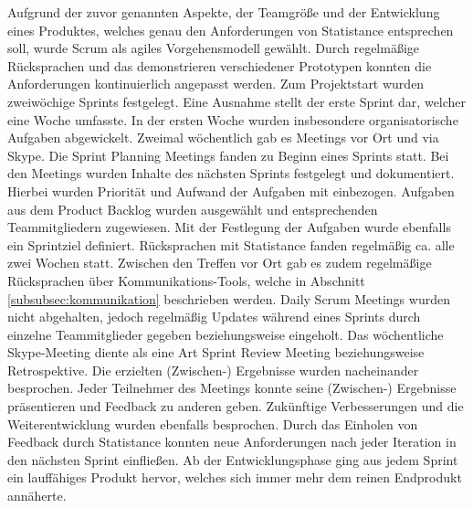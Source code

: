 Aufgrund der zuvor genannten Aspekte, der Teamgröße und der Entwicklung eines Produktes, welches genau den Anforderungen von Statistance entsprechen soll, wurde Scrum als agiles Vorgehensmodell gewählt. Durch regelmäßige Rücksprachen und das demonstrieren verschiedener Prototypen konnten die Anforderungen kontinuierlich angepasst werden. Zum Projektstart wurden zweiwöchige Sprints festgelegt. Eine Ausnahme stellt der erste Sprint dar, welcher eine Woche umfasste. In der ersten Woche wurden insbesondere organisatorische Aufgaben abgewickelt. Zweimal wöchentlich gab es Meetings vor Ort und via Skype. Die Sprint Planning Meetings fanden zu Beginn eines Sprints statt. Bei den Meetings wurden Inhalte des nächsten Sprints festgelegt und dokumentiert. Hierbei wurden Priorität und Aufwand der Aufgaben mit einbezogen. Aufgaben aus dem Product Backlog wurden ausgewählt und entsprechenden Teammitgliedern zugewiesen. Mit der Festlegung der Aufgaben wurde ebenfalls ein Sprintziel definiert. Rücksprachen mit Statistance fanden regelmäßig ca. alle zwei Wochen statt. Zwischen den Treffen vor Ort gab es zudem regelmäßige Rücksprachen über Kommunikations-Tools, welche in Abschnitt \ref{subsubsec:kommunikation} beschrieben werden. Daily Scrum Meetings wurden nicht abgehalten, jedoch regelmäßig Updates während eines Sprints durch einzelne Teammitglieder gegeben beziehungsweise eingeholt. Das wöchentliche Skype-Meeting diente als eine Art Sprint Review Meeting beziehungsweise Retrospektive. Die erzielten (Zwischen-) Ergebnisse wurden nacheinander besprochen. Jeder Teilnehmer des Meetings konnte seine (Zwischen-) Ergebnisse präsentieren und Feedback zu anderen geben. Zukünftige Verbesserungen und die Weiterentwicklung wurden ebenfalls besprochen. Durch das Einholen von Feedback durch Statistance konnten neue Anforderungen nach jeder Iteration in den nächsten Sprint einfließen. Ab der Entwicklungsphase ging aus jedem Sprint ein lauffähiges Produkt hervor, welches sich immer mehr dem reinen Endprodukt annäherte. 


